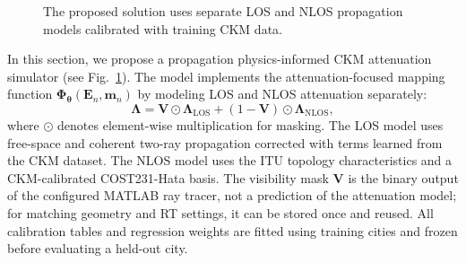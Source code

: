 \documentclass[10pt,conference,letterpaper]{IEEEtran}
\begin{document}
\begin{figure}[t]
\centering
{}
\caption{The proposed solution uses separate LOS and NLOS propagation models calibrated with training CKM data.}
\label{fig:CKM_model}
\end{figure}

In this section, we propose a propagation physics-informed CKM attenuation
simulator (see Fig.~\ref{fig:CKM_model}). The model implements the
attenuation-focused mapping function $\mathbf\Phi_{\boldsymbol\theta}
(\mathbf E_n,\mathbf m_n)$ by modeling LOS and NLOS attenuation separately:
\begin{equation}
\boldsymbol\Lambda=\mathbf V\odot\boldsymbol\Lambda_{\mathrm{LOS}}
 +(1-\mathbf V)\odot\boldsymbol\Lambda_{\mathrm{NLOS}},
\label{eq:combined}
\end{equation}
where $\odot$ denotes element-wise multiplication for masking. The LOS model
uses free-space and coherent two-ray propagation corrected with terms learned
from the CKM dataset. The NLOS model uses the ITU topology characteristics and
a CKM-calibrated COST231-Hata basis. The visibility mask $\mathbf V$ is the
binary output of the configured MATLAB ray tracer, not a prediction of the
attenuation model; for matching geometry and RT settings, it can be stored once
and reused. All calibration tables and regression weights are fitted using
training cities and frozen before evaluating a held-out city.
\end{document}
